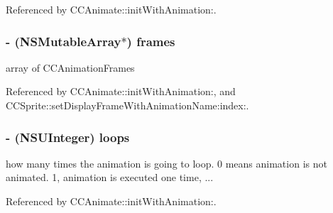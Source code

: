 Referenced by C\-C\-Animate\-::init\-With\-Animation\-:.

\hypertarget{interface_c_c_animation_af32fe84d0d2d7988ed0417e630bb4655}{
\subsubsection[{frames}]{\setlength{\rightskip}{0pt plus 5cm}-\/ (N\-S\-Mutable\-Array$\ast$) {\bf frames}}}\label{interface_c_c_animation_af32fe84d0d2d7988ed0417e630bb4655}
array of C\-C\-Animation\-Frames 

Referenced by C\-C\-Animate\-::init\-With\-Animation\-:, and C\-C\-Sprite\-::set\-Display\-Frame\-With\-Animation\-Name\-:index\-:.

\hypertarget{interface_c_c_animation_add5bdd7131501dbdab9ae814639fc754}{
\subsubsection[{loops}]{\setlength{\rightskip}{0pt plus 5cm}-\/ (N\-S\-U\-Integer) {\bf loops}}}\label{interface_c_c_animation_add5bdd7131501dbdab9ae814639fc754}
how many times the animation is going to loop. 0 means animation is not animated. 1, animation is executed one time, ... 

Referenced by C\-C\-Animate\-::init\-With\-Animation\-:.

